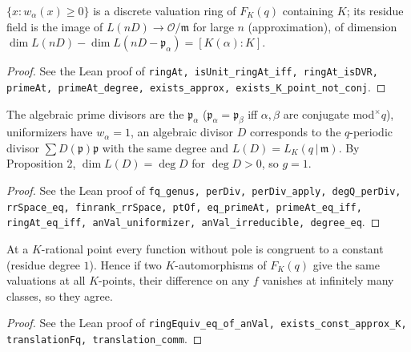 \begin{proposition}
\label{prop:fq-prime-at}
\leanok
$\{x:w_\alpha(x)\ge0\}$ is a discrete valuation ring of $F_K(q)$ containing $K$; its residue field is the image of $L(nD)\to\mathcal O/\mathfrak m$ for large $n$ (approximation), of dimension $\dim L(nD)-\dim L(nD-\mathfrak p_\alpha)=[K(\alpha):K]$.
\end{proposition}
\begin{proof}
\leanok
See the Lean proof of \texttt{ringAt, isUnit\_ringAt\_iff, ringAt\_isDVR, primeAt, primeAt\_degree, exists\_approx, exists\_K\_point\_not\_conj}.
\end{proof}

\begin{theorem}
\label{thm:fq-genus}
\leanok
The algebraic prime divisors are the $\mathfrak p_\alpha$ ($\mathfrak p_\alpha=\mathfrak p_\beta$ iff $\alpha,\beta$ are conjugate mod$^\times q$), uniformizers have $w_\alpha=1$, an algebraic divisor $D$ corresponds to the $q$-periodic divisor $\sum D(\mathfrak p)\mathfrak p$ with the same degree and $L(D)=L_K(q\,|\,\mathfrak m)$. By Proposition 2, $\dim L(D)=\deg D$ for $\deg D>0$, so $g=1$.
\end{theorem}
\begin{proof}
\leanok
See the Lean proof of \texttt{fq\_genus, perDiv, perDiv\_apply, degQ\_perDiv, rrSpace\_eq, finrank\_rrSpace, ptOf, eq\_primeAt, primeAt\_eq\_iff, ringAt\_eq\_iff, anVal\_uniformizer, anVal\_irreducible, degree\_eq}.
\end{proof}

\begin{lemma}
\label{lem:fq-translation-unique}
\leanok
At a $K$-rational point every function without pole is congruent to a constant (residue degree $1$). Hence if two $K$-automorphisms of $F_K(q)$ give the same valuations at all $K$-points, their difference on any $f$ vanishes at infinitely many classes, so they agree.
\end{lemma}
\begin{proof}
\leanok
See the Lean proof of \texttt{ringEquiv\_eq\_of\_anVal, exists\_const\_approx\_K, translationFq, translation\_comm}.
\end{proof}

